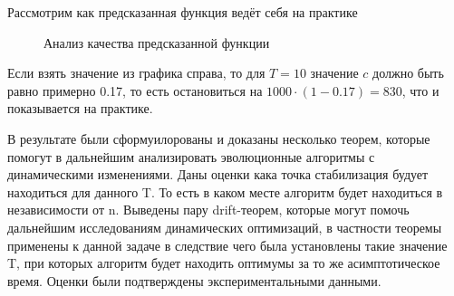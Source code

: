 \documentclass[times]{itmo-student-thesis}
\begin{document}
    \newpage
    Рассмотрим как предсказанная функция ведёт себя на практике
    \begin{figure}[h]
        \begin{minipage}[h]{0.49\linewidth}
        \end{minipage}
        \hfill
        \begin{minipage}[h]{0.49\linewidth}
        \end{minipage}
        \caption{Анализ качества предсказанной функции}
        \label{ris:image1}
    \end{figure}

    Если взять значение из графика справа, то для $T = 10$ значение $c$ должно быть равно примерно 0.17, то есть остановиться на $1000 \cdot (1 - 0.17) = 830$, что и показывается на практике.

    \startconclusionpage
    В результате были сформуилорованы и доказаны несколько теорем, которые помогут в дальнейшим анализировать эволюционные алгоритмы с динамическими изменениями.
    Даны оценки кака точка стабилизация будует находиться для данного T. То есть в каком месте алгоритм будет находиться в независимости от n.
    Выведены пару drift-теорем, которые могут помочь дальнейшим исследованиям динамических оптимизаций, в частности теоремы применены к данной задаче в следствие чего была установлены такие значение T, при которых алгоритм будет находить оптимумы за то же асимптотическое время.
    Оценки были подтверждены экспериментальными данными.
    \printmainbibliography
\end{document}
